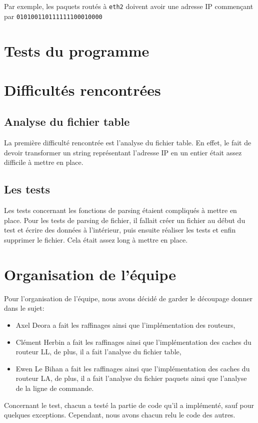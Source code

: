 \documentclass{article}
\begin{document}
Par exemple, les paquets routés à \verb|eth2| doivent avoir une adresse IP commençant par  \verb|010100110111111100010000|


\section{Tests du programme}



\section{Difficultés rencontrées}
\subsection{Analyse du fichier table}
La première difficulté rencontrée est l'analyse du fichier table. En effet, le fait de devoir transformer un string représentant l'adresse IP en un entier était assez difficile à mettre en place.

\subsection{Les tests}
Les tests concernant les fonctions de parsing étaient compliqués à mettre en place. Pour les tests de parsing de fichier, il fallait créer un fichier au début du test et écrire des données à l'intérieur, puis ensuite réaliser les tests et enfin supprimer le fichier. Cela était assez long à mettre en place.

\section{Organisation de l'équipe}
Pour l'organisation de l'équipe, nous avons décidé de garder le découpage donner dans le sujet:
\begin{itemize}
    \item Axel Deora a fait les raffinages ainsi que l'implémentation des routeurs,
    \item Clément Herbin a fait les raffinages ainsi que l'implémentation des caches du routeur LL, de plus, il a fait l'analyse du fichier table,
    \item Ewen Le Bihan a fait les raffinages ainsi que l'implémentation des caches du routeur LA, de plus, il a fait l'analyse du fichier paquets ainsi que l'analyse de la ligne de commande.
\end{itemize}\par
Concernant le test, chacun a testé la partie de code qu'il a implémenté, sauf pour quelques exceptions. Cependant, nous avons chacun relu le code des autres.
\end{document}
